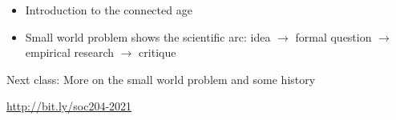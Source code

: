 \documentclass[aspectratio=169]{beamer}
\begin{document}
\begin{frame}

\begin{itemize}
\item Introduction to the connected age
\pause
\item Small world problem shows the scientific arc: idea $\rightarrow$ formal question $\rightarrow$ empirical research $\rightarrow$ critique
\end{itemize}

\end{frame}
\begin{frame}

Next class: More on the small world problem and some history

\end{frame}
\begin{frame}

\Large{\url{http://bit.ly/soc204-2021}}

\end{frame}
\end{document}
